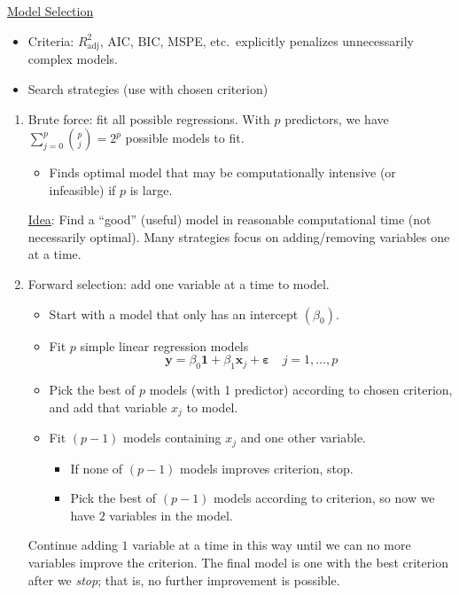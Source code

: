 \underline{Model Selection}
\begin{itemize}
      \item Criteria: $ R^2_{\text{adj}} $, AIC, BIC,
            MSPE, etc.\ explicitly penalizes unnecessarily
            complex models.
      \item Search strategies (use with chosen
            criterion)
\end{itemize}
\begin{enumerate}[label=(\roman*)]
      \item Brute force: fit all possible regressions.
            With $ p $ predictors, we have
            $ \sum_{j=0}^{p} \binom{p}{j}=2^p $ possible models to fit.
            \begin{itemize}
                  \item Finds optimal model that may be computationally
                        intensive (or infeasible) if $ p $ is large.
            \end{itemize}

            \underline{Idea}: Find a ``good'' (useful)
            model in reasonable computational time (not necessarily optimal).
            Many strategies focus on adding/removing variables one at a time.
      \item Forward selection: add one variable at a time to model.
            \begin{itemize}
                  \item Start with a model that only has an intercept $ (\beta_0) $.
                  \item Fit $ p $ simple linear regression models
                        \[ \symbf{y}=\beta_0 \symbf{1}+\beta_1\symbf{x}_j
                              +\symbf{\varepsilon}\quad j=1,\ldots,p \]
                  \item Pick the best of $ p $ models (with 1 predictor)
                        according to chosen criterion, and add that variable
                        $ x_j $ to model.
                  \item Fit $ (p-1) $ models containing $ x_j $
                        and one other variable.
                        \begin{itemize}
                              \item If none of $ (p-1) $ models improves
                                    criterion, stop.
                              \item Pick the best of $ (p-1) $ models according
                                    to criterion, so now we have $ 2 $ variables in the model.
                        \end{itemize}
            \end{itemize}
            Continue adding $ 1 $ variable at a time in this way until
            we can no more variables improve the criterion. The final
            model is one with the best criterion after we \emph{stop};
            that is, no further improvement is possible.


\end{enumerate}
